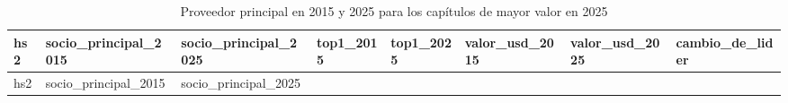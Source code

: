 \documentclass[
]{article}
\begin{document}
\begin{longtable}[]{@{}
  >{\raggedright\arraybackslash}p{}
  >{\raggedright\arraybackslash}p{}
  >{\raggedright\arraybackslash}p{}
  >{\raggedleft\arraybackslash}p{}
  >{\raggedleft\arraybackslash}p{}
  >{\raggedleft\arraybackslash}p{}
  >{\raggedleft\arraybackslash}p{}
  >{\raggedright\arraybackslash}p{}@{}}
\caption{Proveedor principal en 2015 y 2025 para los capítulos de mayor
valor en 2025}\tabularnewline
\toprule\noalign{}
\begin{minipage}[b]{\linewidth}\raggedright
hs2
\end{minipage} & \begin{minipage}[b]{\linewidth}\raggedright
socio\_principal\_2015
\end{minipage} & \begin{minipage}[b]{\linewidth}\raggedright
socio\_principal\_2025
\end{minipage} & \begin{minipage}[b]{\linewidth}\raggedleft
top1\_2015
\end{minipage} & \begin{minipage}[b]{\linewidth}\raggedleft
top1\_2025
\end{minipage} & \begin{minipage}[b]{\linewidth}\raggedleft
valor\_usd\_2015
\end{minipage} & \begin{minipage}[b]{\linewidth}\raggedleft
valor\_usd\_2025
\end{minipage} & \begin{minipage}[b]{\linewidth}\raggedright
cambio\_de\_lider
\end{minipage} \\
\midrule\noalign{}
\endfirsthead
\toprule\noalign{}
\begin{minipage}[b]{\linewidth}\raggedright
hs2
\end{minipage} & \begin{minipage}[b]{\linewidth}\raggedright
socio\_principal\_2015
\end{minipage} & \begin{minipage}[b]{\linewidth}\raggedright
socio\_principal\_2025
\end{minipage} & \begin{minipage}[b]{\linewidth}\raggedleft

\end{minipage}
\end{longtable}
\end{document}

